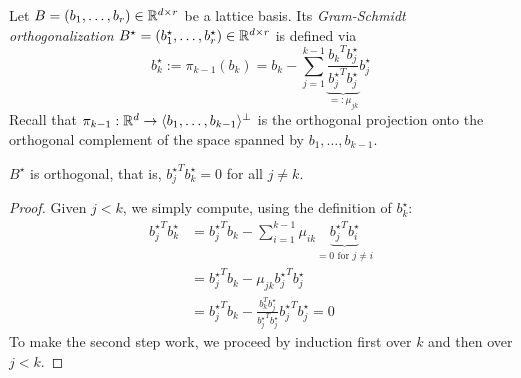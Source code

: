 \begin{definition}
  Let $B = (b_1, \ldots, b_r) \in \mathbb{R}^{d \times r}$ be a lattice basis.
  Its \emph{Gram-Schmidt orthogonalization} $B^\star = (b_1^\star, \ldots, b_r^\star) \in \mathbb{R}^{d \times r}$
  is defined via
  \[
    b_k^\star := \pi_{k-1}(b_k)
      = b_k - \sum_{j=1}^{k-1} \underbrace{\frac{{b_k}^T b_j^\star}{{b_j^\star}^T b_j^\star}}_{=: \mu_{jk}} b_j^\star
  \]
  Recall that $\pi_{k-1} : \mathbb{R}^d \to \langle b_1, \ldots, b_{k-1} \rangle^\bot$ is the orthogonal projection
  onto the orthogonal complement of the space spanned by $b_1, \ldots, b_{k-1}$.
\end{definition}
\begin{lemma}
  $B^\star$ is orthogonal, that is, ${b_j^\star}^T b_k^\star = 0$ for all $j \neq k$.
\end{lemma}
\begin{proof}
  Given $j < k$, we simply compute, using the definition of $b_k^\star$:
  \begin{align*}
    {b_j^\star}^T b_k^\star
      &= {b_j^\star}^T b_k - \sum_{i=1}^{k-1} \mu_{ik} \underbrace{{b_j^\star}^T b_i^\star}_{= 0 \text{ for } j \neq i} \\
      &= {b_j^\star}^T b_k - \mu_{jk} {b_j^\star}^T b_j^\star \\
      &= {b_j^\star}^T b_k - \frac{b_k^T b_j^\star}{{b_j^\star}^T b_j^\star} {b_j^\star}^T b_j^\star = 0
  \end{align*}
  To make the second step work, we proceed by induction first over $k$ and then over $j < k$.
\end{proof}

